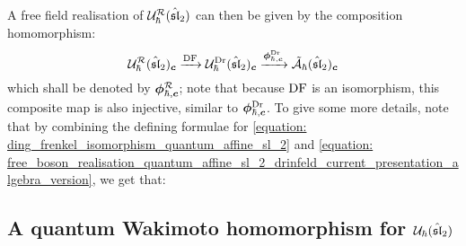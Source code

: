         A free field realisation of $\mathcal{U}_{\hbar}^{\mathcal{R}}(\hat{\mathfrak{sl}}_2)$ can then be given by the composition homomorphism:
            \begin{equation} \label{equation: free_boson_realisation_quantum_affine_sl_2_R_matrix_presentation_algebra_version}
                \mathcal{U}_{\hbar}^{\mathcal{R}}(\hat{\mathfrak{sl}}_2)_{\boldsymbol{c}} \xrightarrow[]{\operatorname{DF}} \mathcal{U}_{\hbar}^{\mathrm{Dr}}(\hat{\mathfrak{sl}}_2)_{\boldsymbol{c}} \xrightarrow[]{\boldsymbol{\phi}^{\mathrm{Dr}}_{\hbar, \boldsymbol{c}}} \tilde{\mathcal{A}}_{\hbar}(\hat{\mathfrak{sl}}_2)_{\boldsymbol{c}}
            \end{equation}
        which shall be denoted by $\boldsymbol{\phi}^{\mathcal{R}}_{\hbar, \boldsymbol{c}}$; note that because $\operatorname{DF}$ is an isomorphism, this composite map is also injective, similar to $\boldsymbol{\phi}^{\mathrm{Dr}}_{\hbar, \boldsymbol{c}}$. To give some more details, note that by combining the defining formulae for \eqref{equation: ding_frenkel_isomorphism_quantum_affine_sl_2} and \eqref{equation: free_boson_realisation_quantum_affine_sl_2_drinfeld_current_presentation_algebra_version}, we get that:

    \subsection{\texorpdfstring{A quantum Wakimoto homomorphism for $\mathcal{U}_{\hbar}(\hat{\mathfrak{sl}}_2)$}{}}